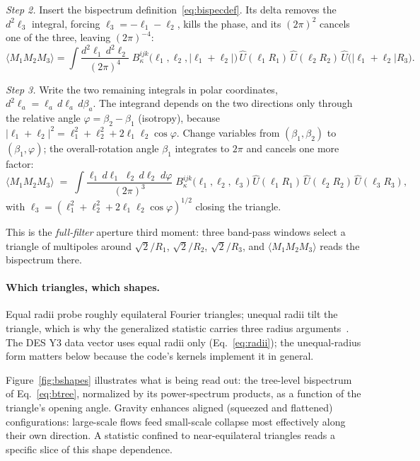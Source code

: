 \documentclass[11pt]{article}
\newcommand{\Uhat}{\widehat{U}}
\newcommand{\bell}{\boldsymbol{\ell}}
\numberwithin{equation}{section}
\begin{document}
\emph{Step 2.}  Insert the bispectrum
definition~\eqref{eq:bispecdef}.  Its delta removes the $d^2\ell_3$
integral, forcing $\bell_3 = -\bell_1 - \bell_2$, kills the phase,
and its $(2\pi)^2$ cancels one of the three, leaving $(2\pi)^{-4}$:
\begin{equation}
  \bigl\langle M_1 M_2 M_3 \bigr\rangle
  =
  \int \frac{d^2\ell_1\, d^2\ell_2}{(2\pi)^4}\;
  B^{ijk}_\kappa\bigl(\ell_1, \ell_2, |\bell_1+\bell_2|\bigr)\,
  \Uhat(\ell_1 R_1)\, \Uhat(\ell_2 R_2)\,
  \Uhat\bigl(|\bell_1+\bell_2| R_3\bigr) .
  \label{eq:map3step2}
\end{equation}

\emph{Step 3.}  Write the two remaining integrals in polar
coordinates, $d^2\ell_a = \ell_a\, d\ell_a\, d\beta_a$.  The
integrand depends on the two directions only through the relative
angle $\varphi = \beta_2 - \beta_1$ (isotropy), because
$|\bell_1 + \bell_2|^2 = \ell_1^2 + \ell_2^2 +
2\ell_1\ell_2\cos\varphi$.  Change variables from
$(\beta_1, \beta_2)$ to $(\beta_1, \varphi)$; the overall-rotation
angle $\beta_1$ integrates to $2\pi$ and cancels one more factor:
\begin{equation}
  \bigl\langle M_1 M_2 M_3 \bigr\rangle
  \;=\;
  \int \frac{\ell_1\, d\ell_1\; \ell_2\, d\ell_2\; d\varphi}
            {(2\pi)^3}\;
  B^{ijk}_\kappa\bigl(\ell_1, \ell_2,
  \ell_3\bigr)\;
  \Uhat(\ell_1 R_1)\, \Uhat(\ell_2 R_2)\, \Uhat(\ell_3 R_3) ,
  \label{eq:map3full}
\end{equation}
with $\ell_3 = (\ell_1^2 + \ell_2^2 +
2\ell_1\ell_2\cos\varphi)^{1/2}$ closing the triangle.

This is the \emph{full-filter} aperture third moment: three
band-pass windows select a triangle of multipoles around
$\sqrt{2}/R_1$, $\sqrt{2}/R_2$, $\sqrt{2}/R_3$, and
$\langle M_1 M_2 M_3\rangle$ reads the bispectrum there.

\paragraph{Which triangles, which shapes.}
Equal radii probe roughly equilateral Fourier triangles; unequal
radii tilt the triangle, which is why the generalized statistic
carries three radius arguments~\cite{SKL}.  The DES Y3 data vector
uses equal radii only (Eq.~\eqref{eq:radii}); the unequal-radius
form matters below because the code's kernels implement it in
general.

Figure~\ref{fig:bshapes} illustrates what is being read out: the
tree-level bispectrum of Eq.~\eqref{eq:btree}, normalized by its
power-spectrum products, as a function of the triangle's opening
angle.  Gravity enhances aligned (squeezed and flattened)
configurations: large-scale flows feed small-scale collapse most
effectively along their own direction.  A statistic confined to
near-equilateral triangles reads a specific slice of this shape
dependence.
\end{document}
